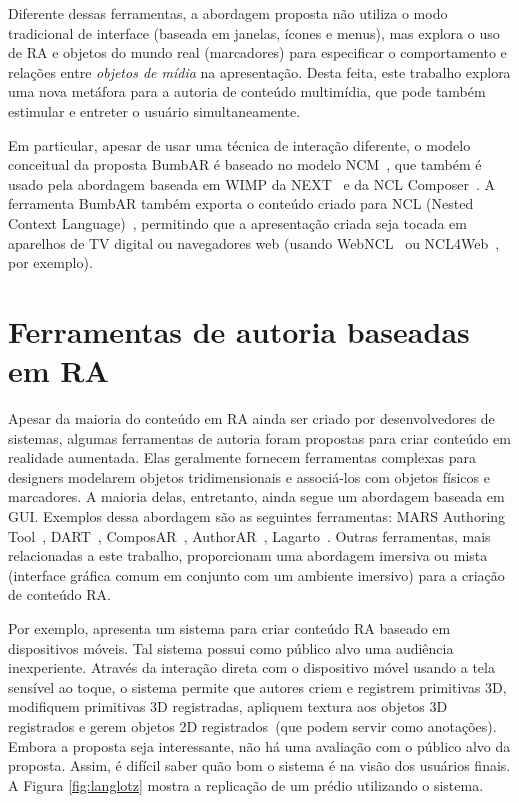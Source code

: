 \documentclass[../main.tex]{subfiles}
\begin{document}
Diferente dessas ferramentas, a abordagem proposta não utiliza o modo tradicional de interface (baseada em janelas, ícones e menus), mas explora o uso de RA e objetos do mundo real (marcadores) para especificar o comportamento e relações entre \emph{objetos de mídia} na apresentação. Desta feita, este trabalho explora uma nova metáfora para a autoria de conteúdo multimídia, que pode também estimular e entreter o usuário simultaneamente.

Em particular, apesar de usar uma técnica de interação diferente, o modelo conceitual da proposta BumbAR é baseado no modelo NCM~\cite{soares_nested_2005}, que também é usado pela abordagem baseada em WIMP da NEXT~\cite{paulo_de_mattos_next_2013} e da NCL Composer~\cite{azevedo_composer_2014}. A ferramenta BumbAR também exporta o conteúdo criado para NCL (Nested Context Language)~\cite{soares2009programando}, permitindo que a apresentação criada seja tocada em aparelhos de TV digital ou navegadores web (usando WebNCL~\cite{melo_webncl_2012} ou NCL4Web~\cite{silva_ncl4web_2013}, por exemplo).

\section{Ferramentas de autoria baseadas em RA}
\label{sec:ferramentas_ra}

Apesar da maioria do conteúdo em RA ainda ser criado por desenvolvedores de sistemas, algumas ferramentas de autoria foram propostas para criar conteúdo em realidade aumentada. Elas geralmente fornecem ferramentas complexas para designers modelarem objetos tridimensionais e associá-los com objetos físicos e marcadores. A maioria delas, entretanto, ainda segue um abordagem baseada em GUI. Exemplos dessa abordagem são as seguintes ferramentas: MARS Authoring Tool~\cite{sinem_authoring_2003}, DART~\cite{macintyre_dart_2004}, ComposAR~\cite{seichter_composar_2008}, AuthorAR~\cite{lucrecia_authorar_2013}, Lagarto~\cite{maia_lagarto_2017}. Outras ferramentas, mais relacionadas a este trabalho, proporcionam uma abordagem imersiva ou mista (interface gráfica comum em conjunto com um ambiente imersivo) para a criação de conteúdo RA.

Por exemplo,  apresenta um sistema para criar conteúdo RA baseado em dispositivos móveis. Tal sistema possui como público alvo uma audiência inexperiente. Através da interação direta com o dispositivo móvel usando a tela sensível ao toque, o sistema permite que autores criem e registrem primitivas 3D, modifiquem primitivas 3D registradas, apliquem textura aos objetos 3D registrados e gerem objetos 2D registrados~(que podem servir como anotações). Embora a proposta seja interessante, não há uma avaliação com o público alvo da proposta. Assim, é difícil saber quão bom o sistema é na visão dos usuários finais. A Figura \ref{fig:langlotz} mostra a replicação de um prédio utilizando o sistema. 
\end{document}
